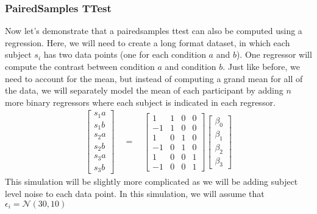 \documentclass[letterpaper,10pt,english]{sphinxmanual}
\begin{document}
\subsubsection{Paired\sphinxhyphen{}Samples T\sphinxhyphen{}Test}
\label{\detokenize{content/Group_Analysis:paired-samples-t-test}}
Now let’s demonstrate that a paired\sphinxhyphen{}samples t\sphinxhyphen{}test can also be computed using a regression. Here, we will need to create a long format dataset, in which each subject \(s_i\) has two data points (one for each condition \(a\) and \(b\)). One regressor will compute the contrast between condition \(a\) and condition \(b\). Just like before, we need to account for the mean, but instead of computing a grand mean for all of the data, we will separately model the mean of each participant by adding \(n\) more binary regressors where each subject is indicated in each regressor.
\begin{equation*}
\begin{split}
\begin{bmatrix}
s_1a \\
s_1b \\
s_2a \\
s_2b \\
s_3a \\
s_3b
\end{bmatrix}
\quad
=
\quad
\begin{bmatrix}
1 & 1 & 0 & 0\\
-1 & 1 & 0 & 0\\
1 & 0 & 1 & 0\\
-1 & 0 & 1 & 0\\
1 & 0 & 0 & 1\\
-1 & 0 & 0 & 1
\end{bmatrix}
\begin{bmatrix}
\beta_0 \\
\beta_1 \\
\beta_2 \\
\beta_3
\end{bmatrix}
\end{split}
\end{equation*}
This simulation will be slightly more complicated as we will be adding subject level noise to each data point. In this simulation, we will assume that \(\epsilon_i = \mathcal{N}(30, 10)\)
\end{document}
